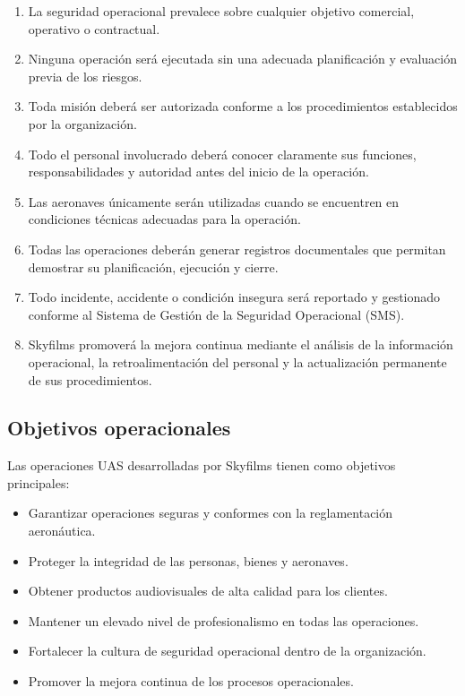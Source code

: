 \begin{enumerate}[label=\arabic*.]

\item La seguridad operacional prevalece sobre cualquier objetivo comercial, operativo o contractual.

\item Ninguna operación será ejecutada sin una adecuada planificación y evaluación previa de los riesgos.

\item Toda misión deberá ser autorizada conforme a los procedimientos establecidos por la organización.

\item Todo el personal involucrado deberá conocer claramente sus funciones, responsabilidades y autoridad antes del inicio de la operación.

\item Las aeronaves únicamente serán utilizadas cuando se encuentren en condiciones técnicas adecuadas para la operación.

\item Todas las operaciones deberán generar registros documentales que permitan demostrar su planificación, ejecución y cierre.

\item Todo incidente, accidente o condición insegura será reportado y gestionado conforme al Sistema de Gestión de la Seguridad Operacional (SMS).

\item Skyfilms promoverá la mejora continua mediante el análisis de la información operacional, la retroalimentación del personal y la actualización permanente de sus procedimientos.
\end{enumerate}


\subsection{Objetivos operacionales}

Las operaciones UAS desarrolladas por Skyfilms tienen como objetivos principales:

\begin{itemize}

\item Garantizar operaciones seguras y conformes con la reglamentación aeronáutica.

\item Proteger la integridad de las personas, bienes y aeronaves.

\item Obtener productos audiovisuales de alta calidad para los clientes.

\item Mantener un elevado nivel de profesionalismo en todas las operaciones.

\item Fortalecer la cultura de seguridad operacional dentro de la organización.

\item Promover la mejora continua de los procesos operacionales.

\end{itemize}


